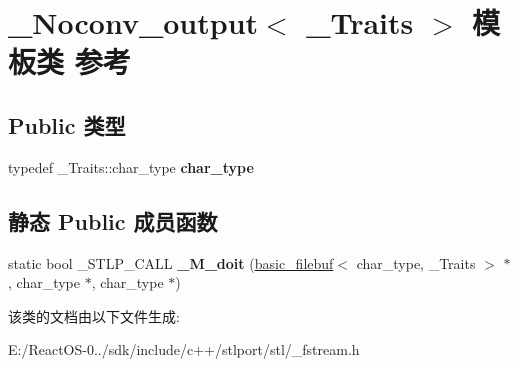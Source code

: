 \hypertarget{class___noconv__output}{}\section{\+\_\+\+Noconv\+\_\+output$<$ \+\_\+\+Traits $>$ 模板类 参考}
\label{class___noconv__output}
\subsection*{Public 类型}
\begin{DoxyCompactItemize}
\item 
\mbox{\label{class___noconv__output_afdbc9f327627646a5cbbd2a749a8ccbb}} 
typedef \+\_\+\+Traits\+::char\+\_\+type {\bfseries char\+\_\+type}
\end{DoxyCompactItemize}
\subsection*{静态 Public 成员函数}
\begin{DoxyCompactItemize}
\item 
\mbox{\label{class___noconv__output_a972090b12973243e35dd052d54f697d5}} 
static bool \+\_\+\+S\+T\+L\+P\+\_\+\+C\+A\+LL {\bfseries \+\_\+\+M\+\_\+doit} (\hyperlink{classbasic__filebuf}{basic\+\_\+filebuf}$<$ char\+\_\+type, \+\_\+\+Traits $>$ $\ast$, char\+\_\+type $\ast$, char\+\_\+type $\ast$)
\end{DoxyCompactItemize}


该类的文档由以下文件生成\+:\begin{DoxyCompactItemize}
\item 
E\+:/\+React\+O\+S-\/0../sdk/include/c++/stlport/stl/\+\_\+fstream.\+h\end{DoxyCompactItemize}
